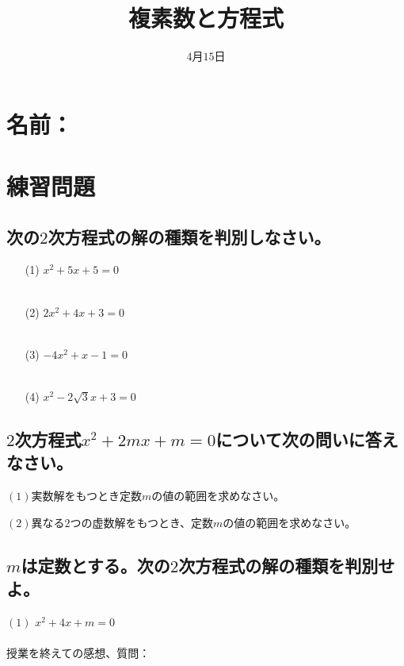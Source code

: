 \documentclass[12pt]{jarticle}
\title{複素数と方程式}
\date{$4$月$15$日}
\begin{document}
\maketitle
\section*{名前：}
\section*{練習問題}
\subsection*{次の$2$次方程式の解の種類を判別しなさい。}
\begin{itemize}
  \item [(1)]$x^2 + 5x + 5 = 0$
  \\
  \\
  \item [(2)]$2x^2 + 4x + 3 = 0$
  \\
  \\
  \item [(3)]$-4x^2 + x -1 = 0$
  \\
  \\
  \item [(4)]$x^2 -2\sqrt{3}x + 3 = 0$
\end{itemize}
\subsection*{$2$次方程式$x^2 + 2mx + m = 0$について次の問いに答えなさい。}
$(1)$実数解をもつとき定数$m$の値の範囲を求めなさい。

$(2)$異なる$2$つの虚数解をもつとき、定数$m$の値の範囲を求めなさい。

\subsection*{$m$は定数とする。次の$2$次方程式の解の種類を判別せよ。}
$(1)$ $x^2 + 4x + m = 0$
\\
\\
授業を終えての感想、質問：
\end{document}
